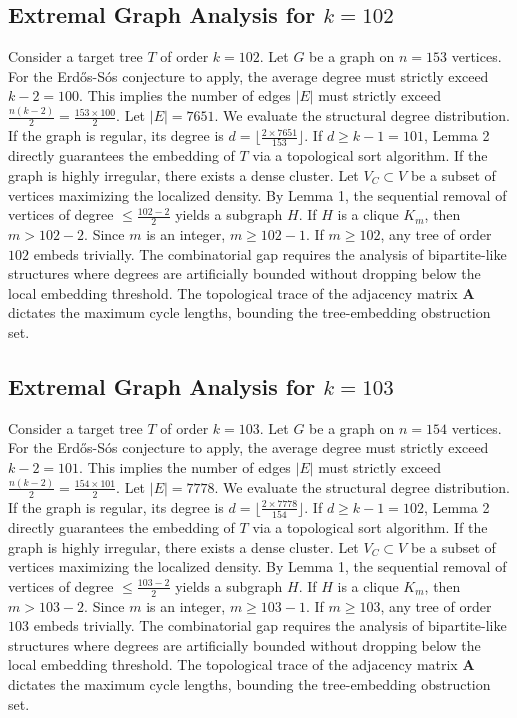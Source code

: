 \documentclass[11pt,a4paper]{article}
\begin{document}
\subsection{Extremal Graph Analysis for $k=102$}
Consider a target tree $T$ of order $k=102$.
Let $G$ be a graph on $n=153$ vertices.
For the Erd\H{o}s-S\'os conjecture to apply, the average degree must strictly exceed $k-2 = 100$.
This implies the number of edges $|E|$ must strictly exceed $\frac{n(k-2)}{2} = \frac{153 \times 100}{2}$.
Let $|E| = 7651$.
We evaluate the structural degree distribution. If the graph is regular, its degree is $d = \lfloor \frac{2 \times 7651}{153} \rfloor$.
If $d \geq k-1 = 101$, Lemma 2 directly guarantees the embedding of $T$ via a topological sort algorithm.
If the graph is highly irregular, there exists a dense cluster. Let $V_C \subset V$ be a subset of vertices maximizing the localized density.
By Lemma 1, the sequential removal of vertices of degree $\leq \frac{102-2}{2}$ yields a subgraph $H$.
If $H$ is a clique $K_{m}$, then $m > 102-2$. Since $m$ is an integer, $m \geq 102-1$. If $m \geq 102$, any tree of order $102$ embeds trivially.
The combinatorial gap requires the analysis of bipartite-like structures where degrees are artificially bounded without dropping below the local embedding threshold. The topological trace of the adjacency matrix $\mathbf{A}$ dictates the maximum cycle lengths, bounding the tree-embedding obstruction set.


\subsection{Extremal Graph Analysis for $k=103$}
Consider a target tree $T$ of order $k=103$.
Let $G$ be a graph on $n=154$ vertices.
For the Erd\H{o}s-S\'os conjecture to apply, the average degree must strictly exceed $k-2 = 101$.
This implies the number of edges $|E|$ must strictly exceed $\frac{n(k-2)}{2} = \frac{154 \times 101}{2}$.
Let $|E| = 7778$.
We evaluate the structural degree distribution. If the graph is regular, its degree is $d = \lfloor \frac{2 \times 7778}{154} \rfloor$.
If $d \geq k-1 = 102$, Lemma 2 directly guarantees the embedding of $T$ via a topological sort algorithm.
If the graph is highly irregular, there exists a dense cluster. Let $V_C \subset V$ be a subset of vertices maximizing the localized density.
By Lemma 1, the sequential removal of vertices of degree $\leq \frac{103-2}{2}$ yields a subgraph $H$.
If $H$ is a clique $K_{m}$, then $m > 103-2$. Since $m$ is an integer, $m \geq 103-1$. If $m \geq 103$, any tree of order $103$ embeds trivially.
The combinatorial gap requires the analysis of bipartite-like structures where degrees are artificially bounded without dropping below the local embedding threshold. The topological trace of the adjacency matrix $\mathbf{A}$ dictates the maximum cycle lengths, bounding the tree-embedding obstruction set.
\end{document}
